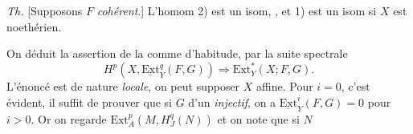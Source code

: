 \documentclass[11pt,a4paper]{article}
\begin{document}
\emph{Th.} [Supposons $F$ \emph{cohérent}.] L'homom 2) est un isom,
, et 1) est un isom si $X$ est noethérien.

On déduit \struck{\ill{}} la  assertion de la
 comme d'habitude, par la suite spectrale
\[
H^{p}(X, \underline{\mathrm{Ext}}^{q}_{Y}(F, G)) \Longrightarrow \mathrm{Ext}^{*}_{Y}(X; F, G).
\]
L'énoncé est de nature \emph{locale}, on peut supposer $X$ affine. Pour
$i = 0$, c'est évident, il suffit de  prouver que si $G$
 d'un  \emph{injectif}, on a
$\underline{\mathrm{Ext}}^{i}_{Y}(F, G) = 0$ pour $i > 0$. Or on regarde
$\mathrm{Ext}^{p}_{A}(M, H^{q}_{J}(N))$ et on note que si $N$
\end{document}
